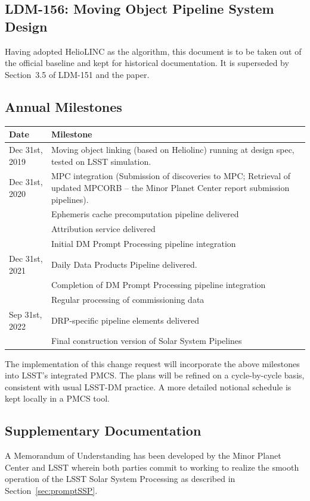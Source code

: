 \documentclass[DM,authoryear,toc,lsstdraft]{lsstdoc}
\begin{document}
\subsection{LDM-156: Moving Object Pipeline System Design}

Having adopted HelioLINC as the algorithm, this document is to be taken out of the official baseline and kept for historical documentation. It is superseded by Section~3.5 of LDM-151 and the \cite{2018AJ....156..135H} paper.

\subsection{Annual Milestones}

	\begin{tabular}{ p{1.5in}p{4.5in} } 
		\hline
		Date & Milestone \\
		\hline
		\hline
		Dec 31st, 2019 & Moving object linking (based on Heliolinc) running at design spec, tested on LSST simulation. \\ 
		Dec 31st, 2020 & MPC integration (Submission of discoveries to MPC; Retrieval of updated MPCORB -- the Minor Planet Center report submission pipelines). \\
		              & Ephemeris cache precomputation pipeline delivered \\
		              & Attribution service delivered \\
		              & Initial DM Prompt Processing pipeline integration \\
		Dec 31st, 2021 & Daily Data Products Pipeline delivered. \\
		              & Completion of DM Prompt Processing pipeline integration \\
		              & Regular processing of commissioning data \\
		Sep 31st, 2022 & DRP-specific pipeline elements delivered \\
		              & Final construction version of Solar System Pipelines \\
		\hline
	\end{tabular}

The implementation of this change request will incorporate the above milestones into LSST's integrated PMCS. The plans will be refined on a cycle-by-cycle basis, consistent with usual LSST-DM practice. A more detailed notional schedule is kept locally in a PMCS tool.

\subsection{Supplementary Documentation}

A Memorandum of Understanding has been developed by the Minor Planet Center and LSST wherein both parties commit to working to realize the smooth operation of the LSST Solar System Processing as described in Section~\ref{sec:promptSSP}.


\end{document}
